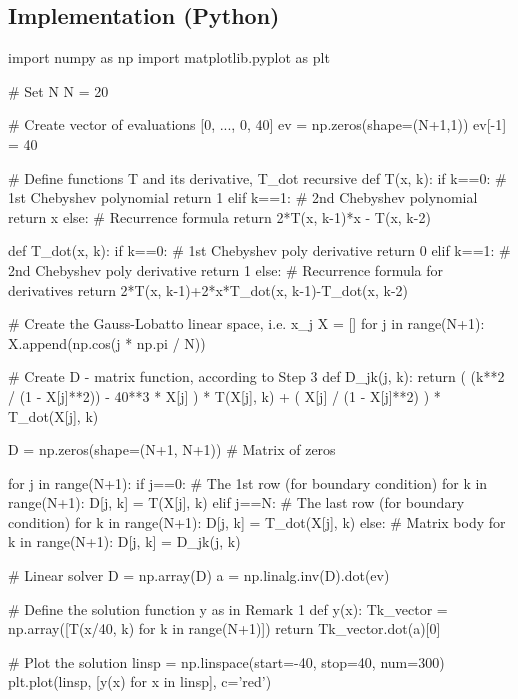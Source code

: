 \documentclass[12pt, a4paper]{article}
\begin{document}
\subsection{Implementation (Python)}
\begin{python}
	import numpy as np
	import matplotlib.pyplot as plt
	
	# Set N
	N = 20
	
	# Create vector of evaluations [0, ..., 0, 40]
	ev = np.zeros(shape=(N+1,1))
	ev[-1] = 40
	
	# Define functions T and its derivative, T_dot recursive
	def T(x, k):
	    if k==0:
	    		# 1st Chebyshev polynomial
	        return 1 
	    elif k==1:
	    		# 2nd Chebyshev polynomial
	        return x 
	    else:
	    		# Recurrence formula
	        return 2*T(x, k-1)*x - T(x, k-2)
	
	def T_dot(x, k):
	    if k==0:
	    		# 1st Chebyshev poly derivative
	        return 0
	    elif k==1:
	    		# 2nd Chebyshev poly derivative
	        return 1
	    else:
	    		# Recurrence formula for derivatives
	        return 2*T(x, k-1)+2*x*T_dot(x, k-1)-T_dot(x, k-2)
	    
	# Create the Gauss-Lobatto linear space, i.e. x_j
	X = []
	for j in range(N+1):
	    X.append(np.cos(j * np.pi / N))
	    
	# Create D - matrix function, according to Step 3
	def D_jk(j, k):
	    return ( (k**2 / (1 - X[j]**2)) - 40**3 * X[j] ) * T(X[j], k) + ( X[j] / (1 - X[j]**2) ) * T_dot(X[j], k)
	
	D = np.zeros(shape=(N+1, N+1)) # Matrix of zeros
	
	for j in range(N+1):
	    if j==0:
	    		# The 1st row (for boundary condition)
	        for k in range(N+1):
	            D[j, k] = T(X[j], k)
	    elif j==N:
	    		# The last row (for boundary condition)
	        for k in range(N+1):
	            D[j, k] = T_dot(X[j], k)
	    else:
	    		# Matrix body
	        for k in range(N+1):
	            D[j, k] = D_jk(j, k)
	            
	# Linear solver
	D = np.array(D)
	a = np.linalg.inv(D).dot(ev)
	
	# Define the solution function y as in Remark 1
	def y(x):
	    Tk_vector = np.array([T(x/40, k) for k in range(N+1)])
	    return Tk_vector.dot(a)[0]
	
	# Plot the solution
	linsp = np.linspace(start=-40, stop=40, num=300)
	plt.plot(linsp, [y(x) for x in linsp], c='red')
\end{python}
\end{document}
